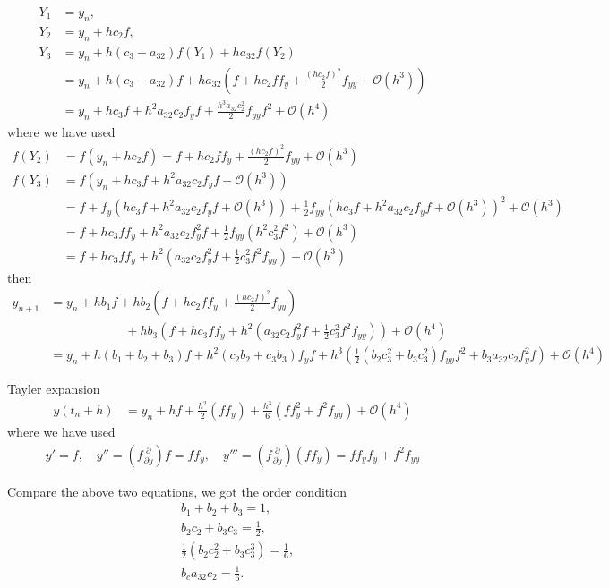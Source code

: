 \documentclass[prd,aps,a4paper,superscriptaddress,onecolumn,footinbib]{revtex4}
\begin{document}
\begin{align}
    Y_1&=y_n, \\
    Y_2&=y_n+hc_2f, \\
    Y_3&=y_n+h(c_3-a_{32})f(Y_1) + ha_{32}f(Y_2) \\
       &=y_n+h(c_3-a_{32})f + ha_{32}
       \left(
           f+hc_2f f_y+\frac{(hc_2f)^2}{2}f_{yy}+\mathcal{O}(h^3)
        \right) \\
       &=y_n + hc_3f + h^2a_{32}c_2f_yf+\frac{h^3a_{32}c_2^2}{2}f_{yy}f^2+\mathcal{O}(h^4)
\end{align}
where we have used
\begin{align}
    f(Y_2)&=f(y_n+hc_2f)=f+hc_2f f_y+\frac{(hc_2f)^2}{2}f_{yy}+\mathcal{O}(h^3)\\
    f(Y_3)&=f(y_n + hc_3f + h^2a_{32}c_2f_yf + \mathcal{O}(h^3)) \\
          &=f + f_y
          \left(
              hc_3f+h^2a_{32}c_2f_yf + \mathcal{O}(h^3)
          \right)
          +\frac{1}{2}f_{yy}
          \left(
              hc_3f+h^2a_{32}c_2f_yf + \mathcal{O}(h^3)
          \right)^2
          + \mathcal{O}(h^3)
          \\
          &=f + hc_3ff_y + h^2a_{32}c_2f_y^2 f
          + \frac{1}{2}f_{yy}(h^2c_3^2f^2)
          + \mathcal{O}(h^3)
          \\
          &=f + hc_3ff_y
          + h^2(a_{32}c_2f_y^2 f + \frac{1}{2}c_3^2f^2f_{yy})
          + \mathcal{O}(h^3)
\end{align}
then
\begin{align}
    y_{n+1}
    &=y_n + hb_1f + h b_2 \left(f+hc_2f f_y+\frac{(hc_2f)^2}{2}f_{yy}\right) \\
    &\qquad\qquad\qquad
    + h b_3
    \left(
        f + hc_3ff_y + h^2(a_{32}c_2f_y^2 f + \frac{1}{2}c_3^2f^2f_{yy})
    \right)
    + \mathcal{O}(h^4) \\
    &=y_n + h(b_1+b_2+b_3)f
    + h^2(c_2b_2+c_3b_3)f_yf
    + h^3(\frac{1}{2}(b_2c_3^2+b_3c_3^2)f_{yy}f^2 + b_3a_{32}c_2f_y^2f)
    + \mathcal{O}(h^4)
\end{align}

Tayler expansion
\begin{align}
    y(t_n+h)
    &=y_n + hf + \frac{h^2}{2}(f f_y)
    + \frac{h^3}{6}
    \left(
        ff_y^2+f^2f_{yy}
    \right)
    + \mathcal{O}(h^4)
\end{align}
where we have used
\begin{align}
    y'=f, \quad
    y''=(f\frac{\partial}{\partial y})f=ff_y, \quad
    y'''=(f\frac{\partial}{\partial y})(f f_y)=ff_yf_y+f^2f_{yy}
\end{align}

Compare the above two equations, we got the order condition
\begin{align}
    &b_1+b_2+b_3 = 1, \\
    &b_2c_2+b_3c_3 = \frac{1}{2}, \\
    &\frac{1}{2}(b_2c_2^2+b_3c_3^3)=\frac{1}{6}, \\
    &b_ca_{32}c_2 = \frac{1}{6}.
\end{align}






%
%
\end{document}
